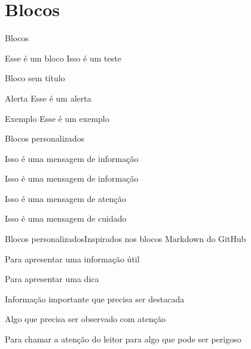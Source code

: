 \documentclass[aspectratio=169]{beamer}
\begin{document}
\section{Blocos}


\begin{frame}{Blocos}
    \begin{block}{Esse é um bloco}
        Isso é um teste
    \end{block}
    \begin{block}{}
    Bloco sem título	
    \end{block}
    \begin{alertblock}{Alerta}
        Esse é um alerta
    \end{alertblock}

    \begin{exampleblock}{Exemplo}
        Esse é um exemplo
    \end{exampleblock}
\end{frame}


\begin{frame}{Blocos personalizados}

    \begin{informacao}
    Isso é uma mensagem de informação
    \end{informacao}
    
    \begin{informacaoazul}
        Isso é uma mensagem de informação
    \end{informacaoazul}

    \begin{atencao}
        Isso é uma mensagem de atenção
    \end{atencao}
    
    \begin{cuidado}
        Isso é uma mensagem de cuidado
    \end{cuidado}
\end{frame}

\begin{frame}[allowframebreaks]{Blocos personalizados}{Inspirados nos blocos Markdown do GitHub}
\begin{nota}
    Para apresentar uma informação útil
\end{nota}

\begin{tip}
    Para apresentar uma dica
\end{tip}

\begin{important}
    Informação importante que precisa ser destacada
\end{important}

\begin{warning}
    Algo que precisa ser observado com atenção
\end{warning}

\begin{caution}
    Para chamar a atenção do leitor para algo que pode ser perigoso
\end{caution}
\end{frame}
\end{document}
